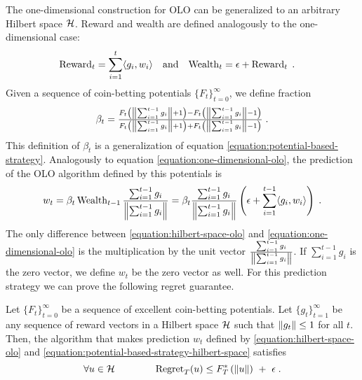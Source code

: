 The one-dimensional construction for OLO can be generalized to an arbitrary
Hilbert space $\mathcal{H}$. Reward and wealth are defined analogously
to the one-dimensional case:
\begin{align*}
\operatorname{Reward}_t &= \sum_{i=1}^t \langle g_i, w_i \rangle &
& \text{and} &
\operatorname{Wealth}_t &= \epsilon + \operatorname{Reward}_t \; .
\end{align*}
Given a sequence of coin-betting potentials $\{F_t\}_{t=0}^\infty$,
we define fraction
\begin{equation}
\label{equation:potential-based-strategy-hilbert-space}
\beta_t = \tfrac{F_t \left(\left\|{\sum_{i=1}^{t-1} g_i}\right\| + 1\right) - F_t\left(\left\|{\sum_{i=1}^{t-1} g_i}\right\| - 1 \right)}{F_t\left(\left\|{\sum_{i=1}^{t-1} g_i}\right\| + 1 \right) + F_t\left(\left\|{\sum_{i=1}^{t-1} g_i}\right\| - 1 \right)} \; .
\end{equation}
This definition of $\beta_t$ is a generalization of equation
\eqref{equation:potential-based-strategy}.  Analogously to equation
\eqref{equation:one-dimensional-olo}, the prediction of the OLO algorithm
defined by this potentials is
\begin{equation}
\label{equation:hilbert-space-olo}
w_t = \beta_t \operatorname{Wealth}_{t-1} \frac{\sum_{i=1}^{t-1} g_i}{\left\|{\sum_{i=1}^{t-1} g_i}\right\|}
= \beta_t \frac{\sum_{i=1}^{t-1} g_i}{\left\|{\sum_{i=1}^{t-1} g_i}\right\|} \left(\epsilon+ \sum_{i=1}^{t-1} \langle g_i, w_i\rangle \right) \; .
\end{equation}
The only difference between \eqref{equation:hilbert-space-olo} and
\eqref{equation:one-dimensional-olo} is the multiplication by the unit vector
$\frac{\sum_{i=1}^{t-1} g_i}{\left\|{\sum_{i=1}^{t-1} g_i}\right\|}$. If $\sum_{i=1}^{t-1}
g_i$ is the zero vector, we define $w_t$ be the zero vector as well.
For this prediction strategy we can prove the following regret guarantee.
%
\begin{theorem}
\label{theorem:hilbert-space-olo-regret-bound}
Let $\{F_t\}_{t=0}^\infty$ be a sequence of excellent coin-betting potentials.
Let $\{g_t\}_{t=1}^\infty$ be any sequence of reward vectors in a Hilbert space
$\mathcal{H}$ such that $\left\|{g_t}\right\| \le 1$ for all $t$. Then, the algorithm that makes
prediction $w_t$ defined by \eqref{equation:hilbert-space-olo} and
\eqref{equation:potential-based-strategy-hilbert-space} satisfies
$$
\forall u \in \mathcal{H} \qquad \qquad
\operatorname{Regret}_T(u) \le F_T^*\left(\left\|{u}\right\| \right) \ + \ \epsilon \; .
$$
\end{theorem}

